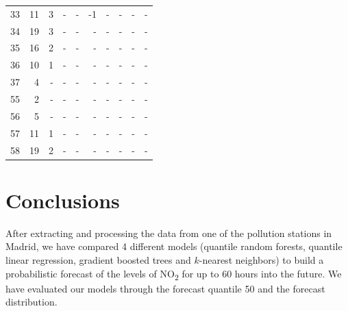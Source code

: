 \documentclass[a4paper,twocolumn,5p]{elsarticle}
\begin{document}
\begin{table}[tbp]
\begin{tabular}{lr|rr|rr|rr|rr}
33 &                11 &              3 &                   - &             - &                   -1 &              - &                    - &             - &                   - \\
34 &                19 &              3 &                   - &             - &                   - &              - &                    - &             - &                   - \\
35 &                16 &              2 &                   - &             - &                   - &              - &                    - &             - &                   - \\
36 &                10 &              1 &                   - &             - &                   - &              - &                    - &             - &                   - \\
37 &                 4 &             - &                   - &             - &                   - &              - &                    - &             - &                   - \\
55 &                 2 &             - &                   - &             - &                   - &              - &                    - &             - &                   - \\
56 &                 5 &             - &                   - &             - &                   - &              - &                    - &             - &                   - \\
57 &                11 &              1 &                   - &             - &                   - &              - &                    - &             - &                   - \\
58 &                19 &              2 &                   - &             - &                   - &              - &                    - &             - &                   - \\
    \bottomrule
    \end{tabular}
\end{table}





\section{Conclusions}
\label{sec:concl}

After extracting and processing the data from one of the pollution
stations in Madrid, we have compared 4 different models (quantile
random forests, quantile linear regression, gradient boosted trees and
$k$-nearest neighbors) to build a probabilistic forecast of the levels
of NO\textsubscript{2} for up to 60 hours into the future. We have
evaluated our models through the forecast quantile 50 and the forecast
distribution.
\end{document}
